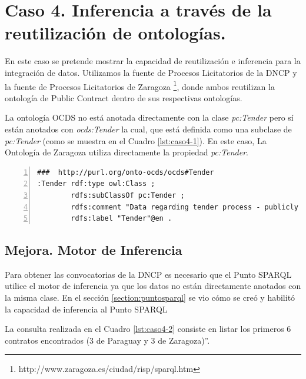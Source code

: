 \section{Caso 4. Inferencia a través de la reutilización de ontologías. }
\label{section:caso4}

En este caso se pretende mostrar la capacidad de reutilización e inferencia para la integración de datos. Utilizamos la fuente de Procesos Licitatorios de la DNCP y la fuente de Procesos Licitatorios de Zaragoza \footnote{http://www.zaragoza.es/ciudad/risp/sparql.htm}, donde ambos reutilizan la ontología de Public Contract dentro de sus respectivas ontologías. 

La ontología OCDS no está anotada directamente con la clase \textit{pc:Tender} pero sí están anotados con \textit{ocds:Tender} la cual, que está definida como una subclase de \textit{pc:Tender} (como se muestra en el Cuadro \ref{lst:caso4-1}). En este caso, La Ontología de Zaragoza utiliza directamente la propiedad \textit{pc:Tender}.

\noindent\begin{minipage}[c]{\textwidth}
\begin{lstlisting}[captionpos=b, caption=Extensión de la ontología reutilizando PC, label={lst:caso4-1},  numbers=left,  numberstyle=\tiny\color{mygray},frame=single]
###  http://purl.org/onto-ocds/ocds#Tender
:Tender rdf:type owl:Class ;
        rdfs:subClassOf pc:Tender ;
        rdfs:comment "Data regarding tender process - publicly inviting prospective contractors to submit bids for evaluation and selecting a winner or winners"@en ;
        rdfs:label "Tender"@en .
 \end{lstlisting}
\end{minipage}

\subsection{Mejora. Motor de Inferencia}
Para obtener las convocatorias de la DNCP es necesario que el Punto SPARQL utilice el motor de inferencia ya que los datos no están directamente anotados con la misma clase. En el sección \ref{section:puntosparql} se vio cómo se creó y habilitó la capacidad de inferencia al Punto SPARQL\hfill \break

La consulta realizada en el Cuadro \ref{lst:caso4-2} consiste en listar los primeros 6 contratos encontrados (3 de Paraguay y 3 de Zaragoza)”.\hfill \break
 
